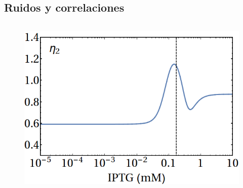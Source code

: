\documentclass[xcolor=dvipsnames]{beamer}
\begin{document}
\subsection{Ruidos y correlaciones}
\begin{frame}
\vspace{-4mm}
\begin{columns}[c]

\begin{figure}[p]
    \centering
    \includegraphics[width=\textwidth]{lan-eta2.png}
\end{figure}


\end{columns}
\end{frame}
\end{document}
